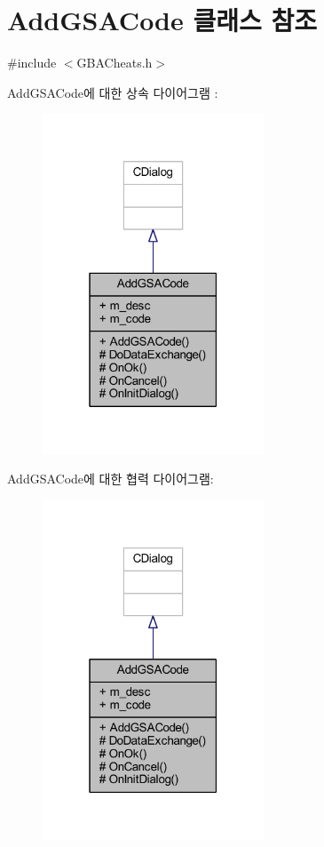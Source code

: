 \hypertarget{class_add_g_s_a_code}{}\section{Add\+G\+S\+A\+Code 클래스 참조}
\label{class_add_g_s_a_code}


{\ttfamily \#include $<$G\+B\+A\+Cheats.\+h$>$}



Add\+G\+S\+A\+Code에 대한 상속 다이어그램 \+: \nopagebreak
\begin{figure}[H]
\begin{center}
\leavevmode
\includegraphics[width=187pt]{class_add_g_s_a_code__inherit__graph}
\end{center}
\end{figure}


Add\+G\+S\+A\+Code에 대한 협력 다이어그램\+:\nopagebreak
\begin{figure}[H]
\begin{center}
\leavevmode
\includegraphics[width=187pt]{class_add_g_s_a_code__coll__graph}
\end{center}
\end{figure}

